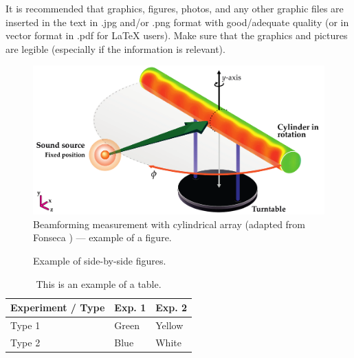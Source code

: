 It is recommended that graphics, figures, photos, and any other graphic files are inserted in the text in .jpg and/or .png format with good/adequate quality (or in vector format in .pdf for \LaTeX\xspace users). Make sure that the graphics and pictures are legible (especially if the information is relevant).

\begin{figure}[!ht] %
	\centering
	\includegraphics[width=0.70\linewidth]{figs/Measurement-Scheme-Fonseca-2013-en.pdf}%
	\caption{Beamforming measurement with cylindrical array (adapted from Fonseca \cite{Fonseca-2013}) — example of a figure.}
	\label{fig:beamforming}%
\end{figure}

\begin{figure}[!ht]
  \centering
	\quad
  \caption{Example of side-by-side figures.}
  \label{subfig.exemplo}
\end{figure}


\begin{table}[ht!]
  \centering {} \setlength\aboverulesep{0pt} \setlength\belowrulesep{0pt}
  \caption{This is an example of a table.}
    \fontsize{11}{12}\selectfont 
    \begin{tabular}{| C{2.8cm} | C{1.8cm} | C{1.8cm} |}
    \hline
    \textbf{ Experiment / Type } & \textbf{Exp. 1} & \textbf{Exp. 2}\\
	\midrule
		Type 1 & Green & Yellow\\
		 Type 2 & Blue & White\\
	\hline
    \end{tabular}
    \label{quad.exemplo}%
    \vspace{2mm}
\end{table}%

